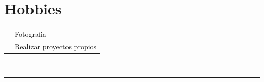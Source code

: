 \documentclass[oneside]{article}
\begin{document}
{\begin{minipage}[t][\dimexpr\textheight-2\fboxrule-2\fboxsep\relax][t]{\dimexpr0.4\textwidth-2\fboxrule-2\fboxsep\relax}
        \section*{\large Hobbies}
        \begin{tabularx}{\textwidth}{cY}
            \faCamera{} & Fotografia \\
            \faCogs{} & Realizar proyectos propios \\
        \end{tabularx}
        \vspace{.3cm}
        \\
        \rule{\linewidth}{0.4pt}
    \end{minipage}%
}%
\end{document}

